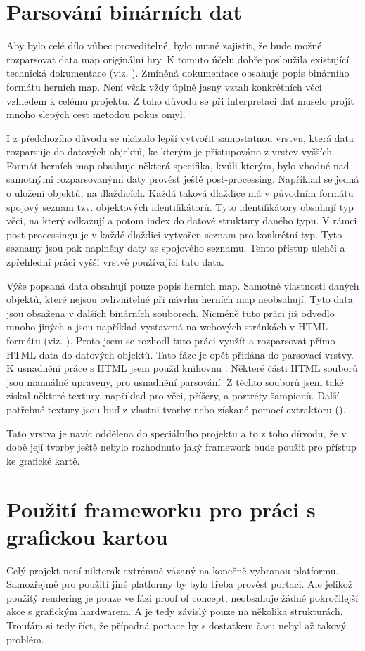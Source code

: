 \section{Parsování binárních dat}
Aby bylo celé dílo vůbec proveditelné, bylo nutné zajistit, že bude možné rozparsovat data map originální hry. K tomuto účelu
dobře posloužila existující technická dokumentace (viz. \citet{TechnicalDocumentationFontanel05}). Zmíněná dokumentace obsahuje
popis binárního formátu herních map. Není však vždy úplně jasný vztah konkrétních věcí vzhledem k celému projektu. Z toho důvodu
se při interpretaci dat muselo projít mnoho slepých cest metodou pokus omyl. 

I z předchozího důvodu se ukázalo lepší vytvořit samostatnou vrstvu, která data rozparsuje do datových objektů, ke kterým
je přistupováno z vrstev vyšších. Formát herních map obsahuje některá specifika, kvůli kterým, bylo vhodné nad samotnými
rozparsovanými daty provést ještě post-processing. Například se jedná o uložení objektů, na dlaždicích. Každá taková dlaždice
má v původním formátu spojový seznam tzv. objektových identifikátorů. Tyto identifikátory obsahují typ věci, na který odkazují
a potom index do datové struktury daného typu. V rámci post-processingu je v každé dlaždici vytvořen seznam pro konkrétní typ.
Tyto seznamy jsou pak naplněny daty ze spojového seznamu. Tento přístup ulehčí a zpřehlední práci vyšší vrstvě používající tato
data.

Výše popsaná data obsahují pouze popis herních map. Samotné vlastnosti daných objektů, které nejsou ovlivnitelné při návrhu
herních map neobsahují. Tyto data jsou obsažena v dalších binárních souborech. Nicméně tuto práci již odvedlo mnoho jiných a 
jsou například vystavená na webových stránkách v HTML formátu (viz. \cite{HtmlDataFontanel05}). Proto jsem se rozhodl tuto 
práci využít a rozparsovat přímo HTML data do datových objektů. Tato fáze je opět přidána do parsovací vrstvy. K usnadnění 
práce s HTML jsem použil knihovnu \citet{HtmlAgilityPack}. Některé části HTML souborů jsou manuálně upraveny, pro usnadnění
parsování. Z těchto souborů jsem také získal některé textury, například pro věci, příšery, a portréty šampionů. Další potřebné
textury jsou buď z vlastni tvorby nebo získané pomocí extraktoru (\citet{TextureExtractor}). 

Tato vrstva je navíc oddělena do speciálního projektu a to z toho důvodu, že v době její tvorby ještě nebylo rozhodnuto jaký framework
bude použit pro přístup ke grafické kartě.

\section{Použití frameworku pro práci s grafickou kartou}
Celý projekt není nikterak extrémně vázaný na konečně vybranou platformu. Samozřejmě pro použití jiné platformy by bylo 
třeba provést portaci. Ale jelikož použitý rendering je pouze ve fázi proof of concept, neobsahuje žádné pokročilejší akce
s grafickým hardwarem. A je tedy závislý pouze na několika strukturách. Troufám si tedy říct, že případná portace by s dostatkem
času nebyl až takový problém.

